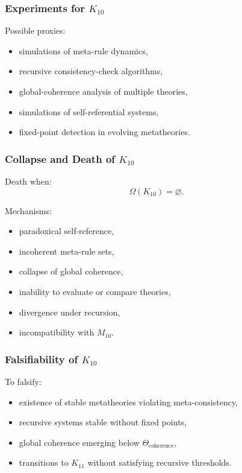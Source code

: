\subsubsection{Experiments for $K_{10}$}

Possible proxies:
\begin{itemize}
    \item simulations of meta-rule dynamics,
    \item recursive consistency-check algorithms,
    \item global-coherence analysis of multiple theories,
    \item simulations of self-referential systems,
    \item fixed-point detection in evolving metatheories.
\end{itemize}

\subsubsection{Collapse and Death of $K_{10}$}

Death when:
\[
\Omega(K_{10})=\varnothing.
\]

Mechanisms:
\begin{itemize}
    \item paradoxical self-reference,
    \item incoherent meta-rule sets,
    \item collapse of global coherence,
    \item inability to evaluate or compare theories,
    \item divergence under recursion,
    \item incompatibility with $M_{10}$.
\end{itemize}

\subsubsection{Falsifiability of $K_{10}$}

To falsify:
\begin{itemize}
    \item existence of stable metatheories violating meta-consistency,
    \item recursive systems stable without fixed points,
    \item global coherence emerging below $\Theta_{\mathrm{coherence}}$,
    \item transitions to $K_{11}$ without satisfying recursive thresholds.
\end{itemize}

